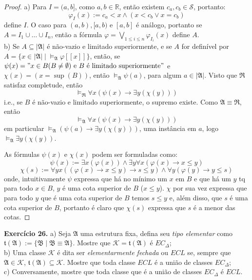 \documentclass[11pt]{article}
\newcommand{\mc}[1]{\mathcal{#1}}
\newcommand{\mf}[1]{\mathfrak{#1}}
\newcommand{\mbb}[1]{\mathbb{#1}}
\begin{document}
\begin{proof}
    a) Para $I=(a,b]$, como $a,b\in\mbb{R}$, então existem $c_a,c_b\in\mc{S}$, portanto:
    $$\varphi_I(x):=c_a<x\wedge (x<c_b\vee x=c_b)$$ define $I$. O caso para $(a,b),[a,b)$ e $[a,b]$ é análogo, portanto se $A=I_1\cup\dots\cup I_n$, então a fórmula $\varphi=\bigvee_{1\leq i\leq n}\varphi_{I_i}(x)$ define $A$.\\
    b) Se $A\subseteq|\mf{A}|$ é não-vazio e limitado superiormente, e se $A$ for definível por $A=\{x\in|\mf{A}|\mid\vDash_\mf{A}\varphi[\![x]\!]\}$, então, se $\psi(x)="x\in B(B\neq\emptyset)\text{ e }B\text{ é limitado superiormente}"$ e $\chi(x)=(x=\sup(B))$, então $\vDash_\mf{A}\psi(a)$, para algum $a\in|\mf{A}|$. Visto que $\mf{R}$ satisfaz completude, então 
    $$\vDash_\mf{R}\forall x(\psi(x)\to\exists y(\chi(y)))$$
    i.e., se $B$ é não-vazio e limitado superiormente, o supremo existe. Como $\mf{A}\equiv\mf{R}$, então $$\vDash_\mf{A}\forall x(\psi(x)\to\exists y(\chi(y)))$$
    em particular $\vDash_\mf{A}(\psi(a)\to\exists y(\chi(y)))$, uma instância em $a$, logo $\vDash_\mf{A}\exists y(\chi(y))$.

    As fórmulas $\psi(x)$ e $\chi(x)$ podem ser formuladas como:
    $$\psi(x):=\exists x(\varphi(x))\wedge\exists y\forall x(\varphi(x)\to x\leq y)$$
    $$\chi(s):=\forall yx((\varphi(x)\to x\leq y)\to s\leq y)\wedge\forall y(\varphi(y)\to y\leq s)$$
    onde, intuitivamente $\psi$ expressa que há no mínimo um $x$ em $B$ e que há um $y$ tq para todo $x\in B$, $y$ é uma cota superior de $B$ ($x\leq y$). $\chi$ por sua vez expressa que para todo $y$ que é uma cota superior de $B$ temos $s\leq y$ e, além disso, que $s$ é uma cota superior de $B$, portanto é claro que $\chi(s)$ expressa que $s$ é a menor das cotas.
\end{proof}

\begin{shaded}
\textbf{Exercício 26.} a) Seja $\mf{A}$ uma estrutura fixa, defina seu \textit{tipo elementar} como $\mf{t}(\mf{A}):=\{\mf{B}\mid\mf{B}\equiv\mf{A}\}$. Mostre que $\mc{K}=\mf{t}(\mf{A})$ é $EC_\Delta$;\\
b) Uma classe $\mc{K}$ é dita ser \textit{elementarmente fechada} ou $ECL$ se, sempre que $\mf{A}\in\mc{K}$, $\mf{t}(\mf{A})\subseteq\mc{K}$. Mostre que toda classe $ECL$ é a união de classes $EC_\Delta$;\\
c) Conversamente, mostre que toda classe que é a união de classes $EC_\Delta$ é $ECL$.
\end{shaded}
\end{document}
